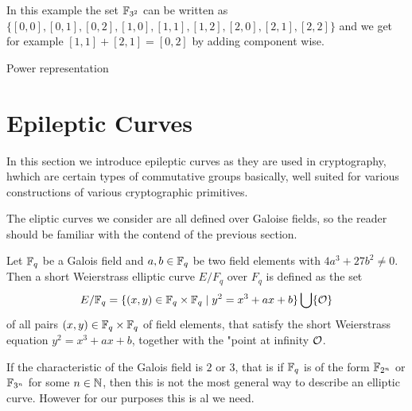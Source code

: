 \begin{example}
In this example the set $\mathbb{F}_{3^2}$ can be written as 
$\{[0,0],[0,1],[0,2],[1,0],[1,1],[1,2],[2,0],[2,1],[2,2]\}$ and we get for example $[1,1]+ [2,1]= [0,2]$ by adding component wise. 
\end{example}

Power representation

\section{Epileptic Curves}
In this section we introduce epileptic curves as they are used in cryptography, hwhich are certain types of commutative groups basically, well suited for various constructions of various cryptographic primitives. 

The eliptic curves we consider are all defined over Galoise fields, so the reader should be familiar with the contend of the previous section.

\begin{definition} Let $\mathbb{F}_{q}$ be a Galois field and $a,b\in \mathbb{F}_q$ be two field elements with $ 4a^3+ 27b^2 \neq 0 $. Then a short Weierstrass elliptic curve $E/F_q$ over $F_q$ is defined as the set
$$
E/\mathbb{F}_q = \{(x,y)\in \mathbb{F}_q\times \mathbb{F}_q\;|\; y^2=x^3+ax+b \} \bigcup \{\mathcal{O}\}
$$
of all pairs $(x,y)\in \mathbb{F}_q\times \mathbb{F}_q$ of field elements, that satisfy the short Weierstrass equation $y^2=x^3+ax+b$, together with the "point at infinity $\mathcal{O}$.
\end{definition}
If the characteristic of the Galois field is $2$ or $3$, that is if $\mathbb{F}_q$ is of the form $\mathbb{F}_{2^n}$ or $\mathbb{F}_{3^n}$ for some $n\in\mathbb{N}$, then this is not the most general way to describe an elliptic curve. However for our purposes this is al we need.

